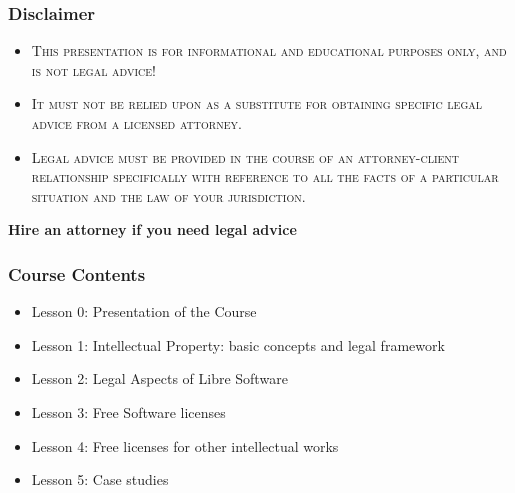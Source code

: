 \documentclass{beamer}
\begin{document}
\begin{frame}
\frametitle{Disclaimer}

\begin{itemize}
\item \textsc{This presentation is for \alert{informational} and \alert{educational purposes only}, and \alert{is not legal advice!}}
\item \textsc{It must not be relied upon as a substitute for obtaining specific legal advice from a licensed attorney.}
\item \textsc{Legal advice must be provided in the course of an attorney-client relationship specifically with reference to \alert{all the facts of a particular situation} and the \alert{law of your jurisdiction}.} 
\end{itemize}

\begin{center}
\textbf{Hire an attorney if you need legal advice}
\end{center}

\end{frame}



\begin{frame}
  \frametitle{Course Contents}

  \begin{itemize}
    \item Lesson 0: Presentation of the Course
    \item Lesson 1: Intellectual Property: basic concepts and legal framework
    \item Lesson 2: Legal Aspects of Libre Software
    \item \alert{Lesson 3: Free Software licenses}
    \item Lesson 4: Free licenses for other intellectual works
    \item Lesson 5: Case studies
  \end{itemize}

\end{frame}
\end{document}
